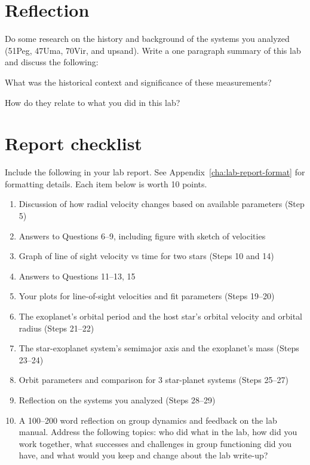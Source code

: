 \section{Reflection}

Do some research on the history and background of the systems you analyzed (51Peg, 47Uma, 70Vir, and upsand). Write a one paragraph summary of this lab and discuss the following:

\begin{steps}
	\item What was the historical context and significance of these measurements?
	
	\item How do they relate to what you did in this lab?
\end{steps}

\section{Report checklist}

Include the following in your lab report. See Appendix~\ref{cha:lab-report-format} for formatting details. Each item below is worth 10 points.

\begin{enumerate}
	\item Discussion of how radial velocity changes based on available parameters (Step 5)
	\item Answers to Questions 6--9, including figure with sketch of velocities
	\item Graph of line of sight velocity vs time for two stars (Steps 10 and 14)
	\item Answers to Questions 11--13, 15
	\item Your plots for line-of-sight velocities and fit parameters (Steps 19--20)
	\item The exoplanet's orbital period and the host star's orbital velocity and orbital radius (Steps 21--22)
	\item The star-exoplanet system's semimajor axis and the exoplanet's mass (Steps 23--24)
	\item Orbit parameters and comparison for 3 star-planet systems (Steps 25--27)
	\item Reflection on the systems you analyzed (Steps 28--29)
	\item A 100--200 word reflection on group dynamics and feedback on the lab manual. Address the following topics: who did what in the lab, how did you work together, what successes and challenges in group functioning did you have, and what would you keep and change about the lab write-up?
\end{enumerate}
